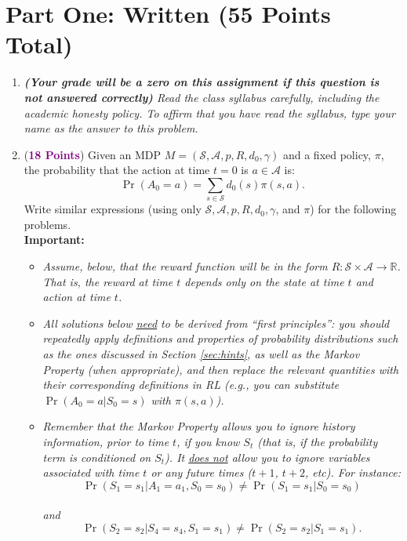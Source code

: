 \documentclass{article}
\newcommand{\POINTS}[1]{\textcolor{purple}{\textbf{{#1}}}}
\begin{document}
\section*{Part One: Written (55 Points Total)}
\begin{enumerate}
    \item \textit{\textbf{(Your grade will be a zero on this assignment if this question is not answered correctly)} Read the class syllabus carefully, including the academic honesty policy. To affirm that you have read the syllabus, type your name as the answer to this problem. }
    \item (\POINTS{18 Points}) Given an MDP $M=(\mathcal S, \mathcal A, p, R, d_0, \gamma)$ and a fixed policy, $\pi$, the probability that the action at time $t=0$ is $a \in \mathcal A$ is:
    \begin{equation}
        \Pr(A_0=a)=\sum_{s \in \mathcal S} d_0(s) \pi(s,a).
    \end{equation}
    Write similar expressions (using only $\mathcal S,\mathcal A,p,R,d_0,\gamma$, and $\pi$) for the following problems.\\
    
    \textbf{Important:}
    
    \begin{itemize}
    
    \item \emph{Assume, below, that the reward function will be in the form $R: \mathcal{S} \times \mathcal{A} \rightarrow \mathbb{R}$. That is, the reward at time $t$ depends only on the state at time $t$ and action at time $t$.}
    
    \item \emph{All solutions below \underline{need} to be derived from ``first principles'': you should repeatedly apply definitions and properties of probability distributions such as the ones discussed in Section \ref{sec:hints}, as well as the Markov Property (when appropriate), and then replace the relevant quantities with their corresponding definitions in RL (e.g., you can substitute $\Pr(A_0=a|S_0=s)$ with $\pi(s,a)$).} 
    
        \item \textit{Remember that the Markov Property allows you to ignore history information, prior to time $t$, if you know $S_t$ (that is, if the probability term is conditioned on $S_t$). It \underline{does not} allow you to ignore variables associated with time $t$ or any future times ($t+1$, $t+2$, etc). For instance:
        \\
        $$\Pr(S_1=s_1 | A_1=a_1, S_0=s_0) \neq \Pr(S_1=s_1 | S_0=s_0) $$
        \\
        and
        $$\Pr(S_2=s_2 | S_4=s_4, S_1=s_1) \neq \Pr(S_2=s_2 | S_1=s_1).$$}


\end{itemize}
\end{enumerate}
\end{document}
